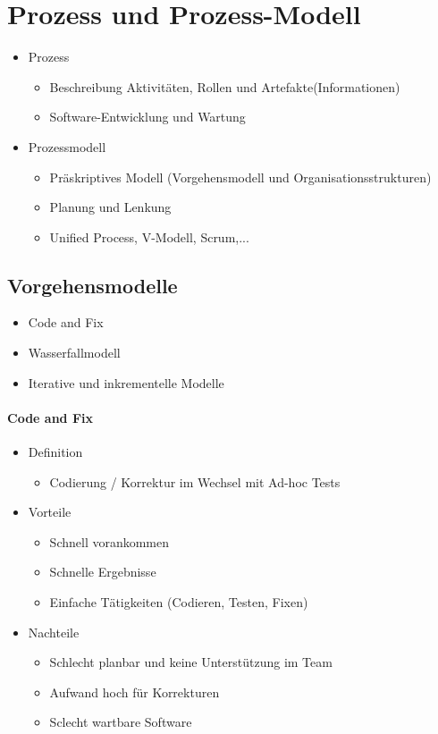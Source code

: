 \documentclass{article}
\begin{document}
\section{Prozess und Prozess-Modell}
\begin{itemize}
    \item Prozess
    \begin{itemize}
        \item Beschreibung Aktivitäten, Rollen und Artefakte(Informationen)
        \item Software-Entwicklung und Wartung
    \end{itemize}
    \item Prozessmodell
    \begin{itemize}
        \item Präskriptives Modell (Vorgehensmodell und Organisationsstrukturen)
        \item Planung und Lenkung
        \item Unified Process, V-Modell, Scrum,...
    \end{itemize}
\end{itemize}
\subsection{Vorgehensmodelle}
\begin{itemize}
    \item Code and Fix
    \item Wasserfallmodell
    \item Iterative und inkrementelle Modelle
\end{itemize}

\paragraph{Code and Fix}
\begin{itemize}
    \item Definition
    \begin{itemize}
        \item Codierung / Korrektur im Wechsel mit Ad-hoc Tests
    \end{itemize}
    \item Vorteile
    \begin{itemize}
        \item Schnell vorankommen
        \item Schnelle Ergebnisse
        \item Einfache Tätigkeiten (Codieren, Testen, Fixen)
    \end{itemize}
    \item Nachteile
    \begin{itemize}
        \item Schlecht planbar und keine Unterstützung im Team
        \item Aufwand hoch für Korrekturen
        \item Sclecht wartbare Software
    \end{itemize}
\end{itemize}
\end{document}
